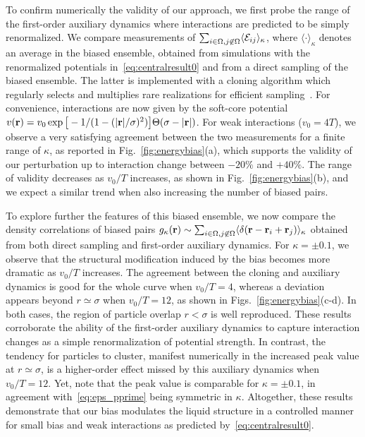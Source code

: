 \documentclass[superscriptaddress, twocolumn, prx, longbibliography, nofootinbib]{revtex4-1}
\begin{document}
To confirm numerically the validity of our approach, we first probe the range of the first-order auxiliary dynamics where interactions {are predicted to be} simply renormalized. We compare measurements of $\sum_{i\in\Omega, j\not\in\Omega}\langle{\cal E}_{ij}\rangle_\kappa$, where $\langle\cdot\rangle_\kappa$ denotes an average in the biased ensemble, obtained from simulations {with} {the renormalized potentials in}~\eqref{eq:centralresult0} and from a direct sampling of the biased ensemble. The latter is implemented with a cloning algorithm which regularly selects and multiplies rare realizations for efficient sampling~\cite{Giadina2006, tailleur2007probing, Hurtado2009, Nemoto2016, Ray2018, Klymko2018, Brewer2018}. For convenience, interactions are now given by the soft-core potential $v({\bf r}) = v_0\exp\big[-1 / (1 - (|{\bf r}|/\sigma)^2)\big]\Theta(\sigma-|{\bf r}|)$. For weak interactions ($v_0=4T$), we observe a very satisfying agreement between the two measurements for a finite range of $\kappa$, as reported in Fig.~\ref{fig:energybias}(a), which supports the validity of our perturbation up to interaction change between $-20\%$ and $+40\%$. The range of validity decreases as $v_0/T$ increases, as shown in Fig.~\ref{fig:energybias}(b), and we expect a similar trend when also increasing the number of biased pairs.


To explore further the features of this biased ensemble, we now compare the density correlations of biased pairs $g_\kappa({\bf r})\sim \sum_{i\in\Omega,j\not\in\Omega}\langle \delta({\bf r}-{\bf r}_i+{\bf r}_j)\rangle_\kappa$ obtained from both direct sampling and first-order auxiliary dynamics. For $\kappa=\pm0.1$, we observe that the structural modification induced by the bias becomes more dramatic as $v_0/T$ increases. The agreement between the cloning and auxiliary dynamics is good for the whole curve when $v_0/T=4$, whereas a deviation appears beyond $r\simeq\sigma$ when $v_0/T=12$, as shown in Figs.~\ref{fig:energybias}(c-d). In both cases, the region of particle overlap $r<\sigma$ is well reproduced. These results corroborate the ability of the first-order auxiliary dynamics to capture interaction changes as a simple renormalization of potential strength. In contrast, the tendency for particles to cluster, manifest numerically in the increased peak value at $r\simeq\sigma$, is a higher-order effect missed by this auxiliary dynamics when $v_0/T=12$. Yet, note that the peak value is comparable for $\kappa=\pm0.1$, in agreement with~\eqref{eq:eps_pprime} being symmetric in $\kappa$. Altogether, these results demonstrate that our bias modulates the liquid structure in a controlled manner for small bias and weak interactions as predicted by~\eqref{eq:centralresult0}.
\end{document}
